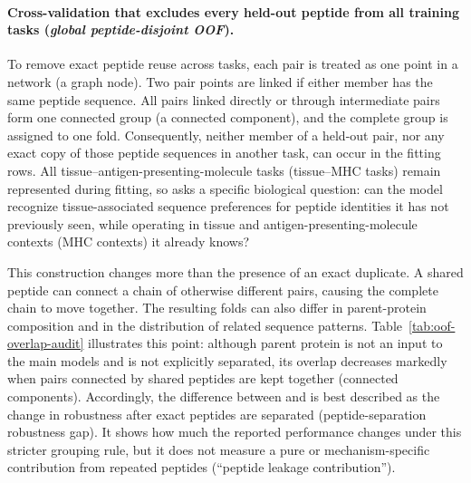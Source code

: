 \paragraph{Cross-validation that excludes every held-out peptide from all training tasks (\emph{global peptide-disjoint OOF}).}
To remove exact peptide reuse across tasks, each pair is treated as one point in a network (a graph node). Two pair points are linked if either member has the same peptide sequence. All pairs linked directly or through intermediate pairs form one connected group (a connected component), and the complete group is assigned to one fold. Consequently, neither member of a held-out pair, nor any exact copy of those peptide sequences in another task, can occur in the fitting rows. All tissue--antigen-presenting-molecule tasks (tissue--MHC tasks) remain represented during fitting, so \plainPeptideOOF{} asks a specific biological question: can the model recognize tissue-associated sequence preferences for peptide identities it has not previously seen, while operating in tissue and antigen-presenting-molecule contexts (MHC contexts) it already knows?

This construction changes more than the presence of an exact duplicate. A shared peptide can connect a chain of otherwise different pairs, causing the complete chain to move together. The resulting folds can also differ in parent-protein composition and in the distribution of related sequence patterns. Table~\ref{tab:oof-overlap-audit} illustrates this point: although parent protein is not an input to the main models and is not explicitly separated, its overlap decreases markedly when pairs connected by shared peptides are kept together (connected components). Accordingly, the difference between \plainMatchedOOF{} and \plainPeptideOOF{} is best described as the change in robustness after exact peptides are separated (peptide-separation robustness gap). It shows how much the reported performance changes under this stricter grouping rule, but it does not measure a pure or mechanism-specific contribution from repeated peptides (``peptide leakage contribution'').

